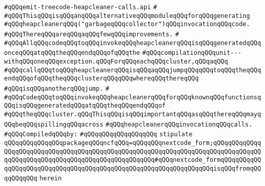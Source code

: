 \label{src/lib/compiler/back/low/main/nextcode/emit-treecode-heapcleaner-calls.api}
\verb|#qQQqemit-treecode-heapcleaner-calls.api|\newline
\verb|#|\newline
\verb|#qQQqThisqQQqisqQQqanqQQqalternativeqQQqmoduleqQQqforqQQqgenerating|\newline
\verb|#qQQqheapcleanerqQQq("garbageqQQqcollector")qQQqinvocationqQQqcode.|\newline
\verb|#qQQqThereqQQqareqQQqaqQQqfewqQQqimprovements.|\newline
\verb|#|\newline
\verb|#qQQqAllqQQqcodeqQQqtoqQQqinvokeqQQqheapcleanerqQQqisqQQqgeneratedqQQqonceqQQqatqQQqtheqQQqendqQQqofqQQqthe|\newline
\verb|#qQQqcompilationqQQqunit---withqQQqoneqQQqexception.qQQqForqQQqeachqQQqcluster,qQQqaqQQq|\newline
\verb|#qQQqcallqQQqtoqQQqheapcleanerqQQqisqQQqaqQQqjumpqQQqqQQqtoqQQqtheqQQqendqQQqofqQQqtheqQQqclusterqQQqqQQqwhereqQQqthereqQQq|\newline
\verb|#qQQqisqQQqanotherqQQqjump.|\newline
\verb|#|\newline
\verb|#qQQqCodeqQQqtoqQQqinvokeqQQqheapcleanerqQQqforqQQqknownqQQqfunctionsqQQqisqQQqgeneratedqQQqatqQQqtheqQQqendqQQqof|\newline
\verb|#qQQqtheqQQqcluster.qQQqThisqQQqisqQQqimportantqQQqasqQQqthereqQQqmayqQQqbeqQQqspillingqQQqacross|\newline
\verb|#qQQqheapcleanerqQQqinvocationqQQqcalls.|\newline
\newline
\verb|#qQQqCompiledqQQqby:|\newline
\verb|#qQQqqQQqqQQqqQQqqQQq|\newline
\newline
\newline
\verb|stipulate|\newline
\verb|qQQqqQQqqQQqqQQqpackageqQQqncfqQQq=qQQqqQQqnextcode_form;qQQqqQQqqQQqqQQqqQQqqQQqqQQqqQQqqQQqqQQqqQQqqQQqqQQqqQQqqQQqqQQqqQQqqQQqqQQqqQQqqQQqqQQqqQQqqQQqqQQqqQQqqQQqqQQqqQQqqQQqqQQq#qQQqnextcode_formqQQqqQQqqQQqqQQqqQQqqQQqqQQqqQQqqQQqqQQqqQQqqQQqqQQqqQQqqQQqqQQqqQQqisqQQqfromqQQqqQQqqQQq|\newline
\verb|herein|\newline
